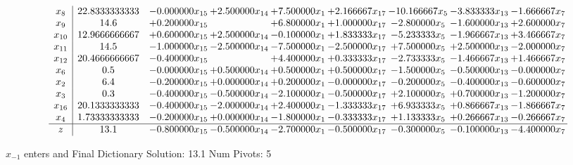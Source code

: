 \documentclass[10pt]{article}
\begin{document}
 \[\begin{array}{c| c c@{\hskip 2pt} c@{\hskip 2pt} c@{\hskip 2pt} c@{\hskip 2pt} c@{\hskip 2pt} c@{\hskip 2pt} c@{\hskip 2pt} }
 x_{8}   &  22.8333333333 & -0.000000 x_{15} & + 2.500000 x_{14} & + 7.500000 x_{1} & + 2.166667 x_{17} & -10.166667 x_{5} & -3.833333 x_{13} & -1.666667 x_{7}\\
 x_{9}   &  14.6 & + 0.200000 x_{15} &   & + 6.800000 x_{1} & + 1.000000 x_{17} & -2.800000 x_{5} & -1.600000 x_{13} & + 2.600000 x_{7}\\
 x_{10}   &  12.9666666667 & + 0.600000 x_{15} & + 2.500000 x_{14} & -0.100000 x_{1} & + 1.833333 x_{17} & -5.233333 x_{5} & -1.966667 x_{13} & + 3.466667 x_{7}\\
 x_{11}   &  14.5 & -1.000000 x_{15} & -2.500000 x_{14} & -7.500000 x_{1} & -2.500000 x_{17} & + 7.500000 x_{5} & + 2.500000 x_{13} & -2.000000 x_{7}\\
 x_{12}   &  20.4666666667 & -0.400000 x_{15} &   & + 4.400000 x_{1} & + 0.333333 x_{17} & -2.733333 x_{5} & -1.466667 x_{13} & + 1.466667 x_{7}\\
 x_{6}   &  0.5 & -0.000000 x_{15} & + 0.500000 x_{14} & + 0.500000 x_{1} & + 0.500000 x_{17} & -1.500000 x_{5} & -0.500000 x_{13} & -0.000000 x_{7}\\
 x_{2}   &  6.4 & -0.200000 x_{15} & + 0.000000 x_{14} & + 0.200000 x_{1} & -0.000000 x_{17} & -0.200000 x_{5} & -0.400000 x_{13} & -0.600000 x_{7}\\
 x_{3}   &  0.3 & -0.400000 x_{15} & -0.500000 x_{14} & -2.100000 x_{1} & -0.500000 x_{17} & + 2.100000 x_{5} & + 0.700000 x_{13} & -1.200000 x_{7}\\
 x_{16}   &  20.1333333333 & -0.400000 x_{15} & -2.000000 x_{14} & + 2.400000 x_{1} & -1.333333 x_{17} & + 6.933333 x_{5} & + 0.866667 x_{13} & -1.866667 x_{7}\\
 x_{4}   &  1.73333333333 & -0.200000 x_{15} & + 0.000000 x_{14} & -1.800000 x_{1} & -0.333333 x_{17} & + 1.133333 x_{5} & + 0.266667 x_{13} & -0.266667 x_{7}\\
\hline
z    &  13.1 & -0.800000 x_{15} & -0.500000 x_{14} & -2.700000 x_{1} & -0.500000 x_{17} & -0.300000 x_{5} & -0.100000 x_{13} & -4.400000 x_{7}\\
\end{array}\]


 $ x_{-1} $ enters and Final Dictionary
Solution:  13.1
Num Pivots:  5
\end{document}
